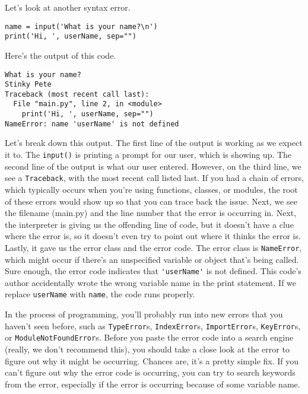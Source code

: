 Let's look at another syntax error.\par
\begin{lstlisting}[style=pippython]
name = input('What is your name?\n')
print('Hi, ', userName, sep="")
\end{lstlisting}
Here's the output of this code.\par
\begin{lstlisting}[style=none]
What is your name?
Stinky Pete
Traceback (most recent call last):
  File "main.py", line 2, in <module>
    print('Hi, ', userName, sep="")
NameError: name 'userName' is not defined
\end{lstlisting}
Let's break down this output. The first line of the output is working as we expect it to. The \verb|input()| is printing a prompt for our user, which is showing up. The second line of the output is what our user entered. However, on the third line, we see a \verb|Traceback|, with the most recent call listed last. If you had a chain of errors, which typically occurs when you're using functions, classes, or modules, the root of these errors would show up so that you can trace back the issue. Next, we see the filename (main.py) and the line number that the error is occurring in. Next, the interpreter is giving us the offending line of code, but it doesn't have a clue where the error is, so it doesn't even try to point out where it thinks the error is. Lastly, it gave us the error class and the error code. The error class is \verb|NameError|, which might occur if there's an unspecified variable or object that's being called. Sure enough, the error code indicates that \verb|'userName'| is not defined. This code's author accidentally wrote the wrong variable name in the print statement. If we replace \verb|userName| with \verb|name|, the code runs properly.\par
In the process of programming, you'll probably run into new errors that you haven't seen before, such as \verb|TypeError|s, \verb|IndexError|s, \verb|ImportError|s, \verb|KeyError|s, or \verb|ModuleNotFoundError|s. Before you paste the error code into a search engine (really, we don't recommend this), you should take a close look at the error to figure out why it might be occurring. Chances are, it's a pretty simple fix. If you can't figure out why the error code is occurring, you can try to search keywords from the error, especially if the error is occurring because of some variable name.\par
